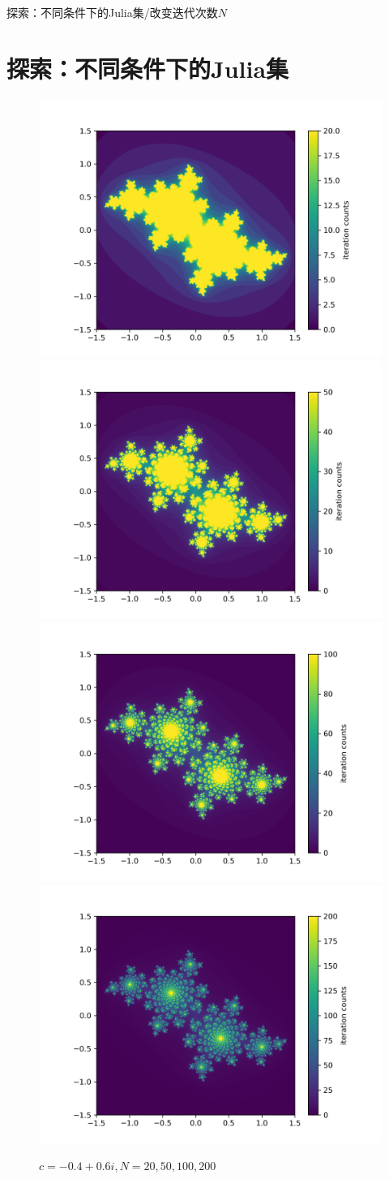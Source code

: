 \documentclass{beamer}
\begin{document}
\begin{frame}{探索：不同条件下的Julia集/改变迭代次数$N$}
\section{探索：不同条件下的Julia集}
\begin{figure}[H]
	\includegraphics[width=.4\textwidth]{../png/300dpi/julia_cx-0.4cy0.6_N20.png}
	\includegraphics[width=.4\textwidth]{../png/300dpi/julia_cx-0.4cy0.6_N50.png}
	\includegraphics[width=.4\textwidth]{../png/300dpi/julia_cx-0.4cy0.6_N100.png}
	\includegraphics[width=.4\textwidth]{../png/300dpi/julia_cx-0.4cy0.6_N200.png}
	\caption{$c=-0.4+0.6i,N=20,50,100,200$}
\end{figure}
\end{frame}
\end{document}
